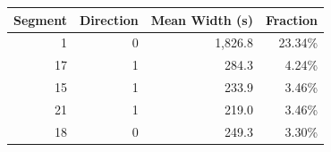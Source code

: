 \begin{tabular}{rrrr}
\toprule
\textbf{Segment} & \textbf{Direction} & \textbf{Mean Width (s)} & \textbf{Fraction} \\
\midrule
1 & 0 & 1,826.8 & 23.34\%  \\
17 & 1 & 284.3 & 4.24\%  \\
15 & 1 & 233.9 & 3.46\%  \\
21 & 1 & 219.0 & 3.46\%  \\
18 & 0 & 249.3 & 3.30\%  \\
\bottomrule
\end{tabular}